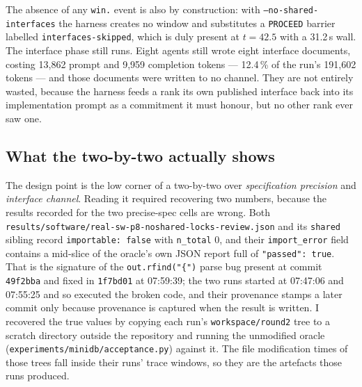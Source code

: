 \documentclass[11pt]{article}
\begin{document}
The absence of any \texttt{win.} event is also by construction: with
\texttt{--no-shared-interfaces} the harness creates no window and substitutes a \texttt{PROCEED}
barrier labelled \texttt{interfaces-skipped}, which is duly present at $t = 42.5$ with a 31.2\,s
wall. The interface phase still runs. Eight agents still wrote eight interface documents,
costing 13,862 prompt and 9,959 completion tokens --- 12.4\,\% of the run's 191,602 tokens ---
and those documents were written to no channel. They are not entirely wasted, because the
harness feeds a rank its own published interface back into its implementation prompt as a
commitment it must honour, but no other rank ever saw one.

\subsection{What the two-by-two actually shows}

The design point is the low corner of a two-by-two over \emph{specification precision} and
\emph{interface channel}. Reading it required recovering two numbers, because the results
recorded for the two precise-spec cells are wrong. Both
\texttt{results/software/real-sw-p8-noshared-locks-review.json} and its \texttt{shared} sibling
record \texttt{importable: false} with \texttt{n\_total} 0, and their \texttt{import\_error}
field contains a mid-slice of the oracle's own JSON report full of \texttt{"passed": true}. That
is the signature of the \texttt{out.rfind("\{")} parse bug present at commit \texttt{49f2bba} and
fixed in \texttt{1f7bd01} at 07:59:39; the two runs started at 07:47:06 and 07:55:25 and so
executed the broken code, and their provenance stamps a later commit only because provenance is
captured when the result is written. I recovered the true values by copying each run's
\texttt{workspace/round2} tree to a scratch directory outside the repository and running the
unmodified oracle (\texttt{experiments/minidb/acceptance.py}) against it. The file modification
times of those trees fall inside their runs' trace windows, so they are the artefacts those runs
produced.
\end{document}
